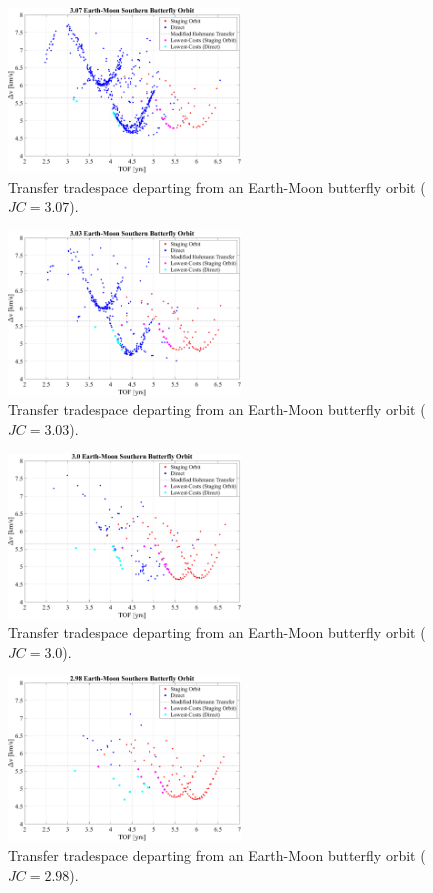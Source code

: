 \begin{figure}[ht]
    \centering
    \includegraphics[width=0.55\textwidth]{figures/TradeSpace_Butterfly_3_07.pdf}
    \caption{Transfer tradespace departing from an Earth-Moon butterfly orbit ($JC=3.07$).}
\end{figure}

\begin{figure}[ht]
    \centering
    \includegraphics[width=0.55\textwidth]{figures/TradeSpace_Butterfly_3_03.pdf}
    \caption{Transfer tradespace departing from an Earth-Moon butterfly orbit ($JC=3.03$).}
\end{figure}

\begin{figure}[ht]
    \centering
    \includegraphics[width=0.55\textwidth]{figures/TradeSpace_Butterfly_3_00.pdf}
    \caption{Transfer tradespace departing from an Earth-Moon butterfly orbit ($JC=3.0$).}
\end{figure}

\begin{figure}[ht]
    \centering
    \includegraphics[width=0.55\textwidth]{figures/TradeSpace_Butterfly_2_98.pdf}
    \caption{Transfer tradespace departing from an Earth-Moon butterfly orbit ($JC=2.98$).}
\end{figure}
